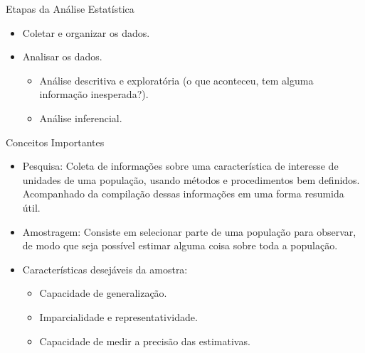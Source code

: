\documentclass[14pt,aspectratio=1610]{beamer}
\begin{document}
\begin{frame}{Etapas da Análise Estatística}
    \begin{block}{}
    \justifying
\begin{itemize}[label={}]
\item Coletar e organizar os dados.\pause
\item Analisar os dados.\pause
\begin{itemize}[label={}]
\item Análise descritiva e exploratória (o que aconteceu, tem alguma informação inesperada?).\pause
\item Análise inferencial.\pause
\end{itemize}
\end{itemize}
    \end{block}
\end{frame}

\begin{frame}{Conceitos Importantes}
    \begin{block}{}
    \justifying
\begin{itemize}[label={}]
\item Pesquisa: Coleta de informações sobre uma característica de interesse de unidades de uma população, usando métodos e procedimentos bem definidos. Acompanhado da compilação dessas informações em uma forma resumida útil.\pause
\item Amostragem: Consiste em selecionar parte de uma população para observar, de modo que seja possível estimar alguma coisa sobre toda a população.\pause
\item Características desejáveis da amostra:\pause
\begin{itemize}[label={}]
\item Capacidade de generalização.\pause
\item Imparcialidade e representatividade.\pause
\item Capacidade de medir a precisão das estimativas.
\end{itemize}
\end{itemize}
    \end{block}
\end{frame}
\end{document}
